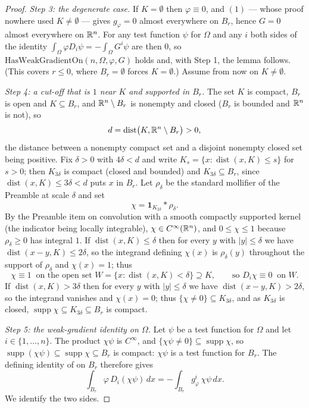 \begin{proof}
\emph{Step 3: the degenerate case.}  If $K=\emptyset$ then $\varphi\equiv0$, and
$(1)$ --- whose proof nowhere used $K\ne\emptyset$ --- gives $g_\varphi=0$ almost
everywhere on $B_r$, hence $G=0$ almost everywhere on $\mathbb{R}^n$.  For any test
function $\psi$ for $\Omega$ and any $i$ both sides of the identity
$\int_\Omega\varphi D_i\psi=-\int_\Omega G^i\psi$ are then $0$, so
$\mathrm{HasWeakGradientOn}(n,\Omega,\varphi,G)$ holds and, with Step 1, the
lemma follows.  (This covers $r\le0$, where $B_r=\emptyset$ forces
$K=\emptyset$.)  Assume from now on $K\ne\emptyset$.

\emph{Step 4: a cut-off that is $1$ near $K$ and supported in $B_r$.}  The set
$K$ is compact, $B_r$ is open and $K\subseteq B_r$, and $\mathbb{R}^n\setminus B_r$ is
nonempty and closed ($B_r$ is bounded and $\mathbb{R}^n$ is not), so
\[
d=\operatorname{dist}\bigl(K,\mathbb{R}^n\setminus B_r\bigr)>0 ,
\]
the distance between a nonempty compact set and a disjoint nonempty closed set
being positive.  Fix $\delta>0$ with $4\delta<d$ and write
$K_s=\{x:\operatorname{dist}(x,K)\le s\}$ for $s>0$; then $K_{3\delta}$ is
compact (closed and bounded) and $K_{3\delta}\subseteq B_r$, since
$\operatorname{dist}(x,K)\le3\delta<d$ puts $x$ in $B_r$.  Let $\rho_\delta$ be
the standard mollifier of the Preamble at scale $\delta$ and set
\[
\chi=\mathbf1_{K_{2\delta}}*\rho_\delta .
\]
By the Preamble item on convolution with a smooth compactly supported kernel
(the indicator being locally integrable), $\chi\in C^\infty(\mathbb{R}^n)$, and
$0\le\chi\le1$ because $\rho_\delta\ge0$ has integral $1$.  If
$\operatorname{dist}(x,K)\le\delta$ then for every $y$ with $|y|\le\delta$ we
have $\operatorname{dist}(x-y,K)\le2\delta$, so the integrand defining
$\chi(x)$ is $\rho_\delta(y)$ throughout the support of $\rho_\delta$ and
$\chi(x)=1$; thus
\[
\chi\equiv1\ \text{ on the open set }W=\{x:\operatorname{dist}(x,K)<\delta\}
\supseteq K ,
\qquad\text{so } D_i\chi\equiv0\ \text{ on } W .
\]
If $\operatorname{dist}(x,K)>3\delta$ then for every $y$ with $|y|\le\delta$ we
have $\operatorname{dist}(x-y,K)>2\delta$, so the integrand vanishes and
$\chi(x)=0$; thus $\{\chi\ne0\}\subseteq K_{3\delta}$, and as $K_{3\delta}$ is
closed, $\operatorname{supp}\chi\subseteq K_{3\delta}\subseteq B_r$ is compact.

\emph{Step 5: the weak-gradient identity on $\Omega$.}  Let $\psi$ be a test
function for $\Omega$ and let $i\in\{1,\dots,n\}$.  The product $\chi\psi$ is
$C^\infty$, and $\{\chi\psi\ne0\}\subseteq\operatorname{supp}\chi$, so
$\operatorname{supp}(\chi\psi)\subseteq\operatorname{supp}\chi\subseteq B_r$ is
compact: $\chi\psi$ is a test function for $B_r$.  The defining identity of
 on $B_r$ therefore gives
\[
\int_{B_r}\varphi\,D_i(\chi\psi)\,dx=-\int_{B_r}g_\varphi^i\,\chi\psi\,dx .
\tag{2}
\]
We identify the two sides.


\end{proof}
